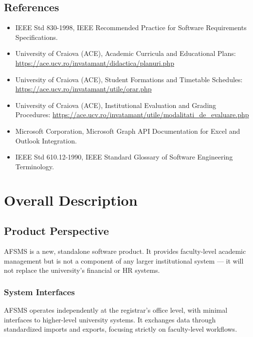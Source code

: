 \documentclass[11pt, a4paper]{article}
\begin{document}
\subsection{References}
\begin{itemize}
    \item IEEE Std 830-1998, IEEE Recommended Practice for Software Requirements Specifications.
    \item University of Craiova (ACE), Academic Curricula and Educational Plans: \url{https://ace.ucv.ro/invatamant/didactica/planuri.php}
    \item University of Craiova (ACE), Student Formations and Timetable Schedules: \url{https://ace.ucv.ro/invatamant/utile/orar.php}
    \item University of Craiova (ACE), Institutional Evaluation and Grading Procedures: \url{https://ace.ucv.ro/invatamant/utile/modalitati_de_evaluare.php}
    \item Microsoft Corporation, Microsoft Graph API Documentation for Excel and Outlook Integration.
    \item IEEE Std 610.12-1990, IEEE Standard Glossary of Software Engineering Terminology.
\end{itemize}


\section{Overall Description}

\subsection{Product Perspective}
AFSMS is a new, standalone software product. It provides faculty-level academic management but is not a component of any larger institutional system --- it will not replace the university's financial or HR systems.

\subsubsection{System Interfaces}
AFSMS operates independently at the registrar's office level, with minimal interfaces to higher-level university systems. It exchanges data through standardized imports and exports, focusing strictly on faculty-level workflows.
\end{document}
